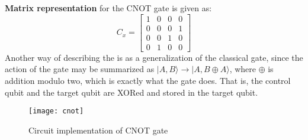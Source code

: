 \documentclass[12pt]{report}
\begin{document}
\begin{enumerate}
\textbf{Matrix representation} for the CNOT gate is given as:
\begin{equation*}
C_x = 
\begin{bmatrix} 
1& 0 & 0& 0\\ 
0& 0 & 0& 1\\
0& 0 & 1& 0\\
0& 1 & 0& 0
\end{bmatrix}
\end{equation*}
Another way of describing the is as a generalization of the classical gate, since the action of the gate may be summarized as $|A,B\rangle \to |A,B \oplus A\rangle$, where $\oplus$ is addition modulo two, which is exactly what the gate does. That is, the control qubit and the target qubit are XORed and stored in the target qubit.
\begin{figure}[h]
\centering
\texttt{[image: cnot]}
\caption{Circuit implementation of CNOT gate}
\label{fig:cnot}
\end{figure}


\end{enumerate}
\end{document}
